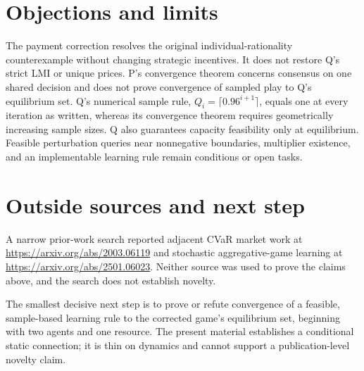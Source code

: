 \documentclass{article}
\begin{document}
\section{Objections and limits}

The payment correction resolves the original individual-rationality counterexample without changing strategic incentives. It does not restore Q's strict LMI or unique prices. P's convergence theorem concerns consensus on one shared decision and does not prove convergence of sampled play to Q's equilibrium set. Q's numerical sample rule, \(Q_i=\lceil0.96^{i+1}\rceil\), equals one at every iteration as written, whereas its convergence theorem requires geometrically increasing sample sizes. Q also guarantees capacity feasibility only at equilibrium. Feasible perturbation queries near nonnegative boundaries, multiplier existence, and an implementable learning rule remain conditions or open tasks. 

\section{Outside sources and next step}

A narrow prior-work search reported adjacent CVaR market work at \url{https://arxiv.org/abs/2003.06119} and stochastic aggregative-game learning at \url{https://arxiv.org/abs/2501.06023}. Neither source was used to prove the claims above, and the search does not establish novelty. 

The smallest decisive next step is to prove or refute convergence of a feasible, sample-based learning rule to the corrected game's equilibrium set, beginning with two agents and one resource. The present material establishes a conditional static connection; it is thin on dynamics and cannot support a publication-level novelty claim. 
\end{document}
